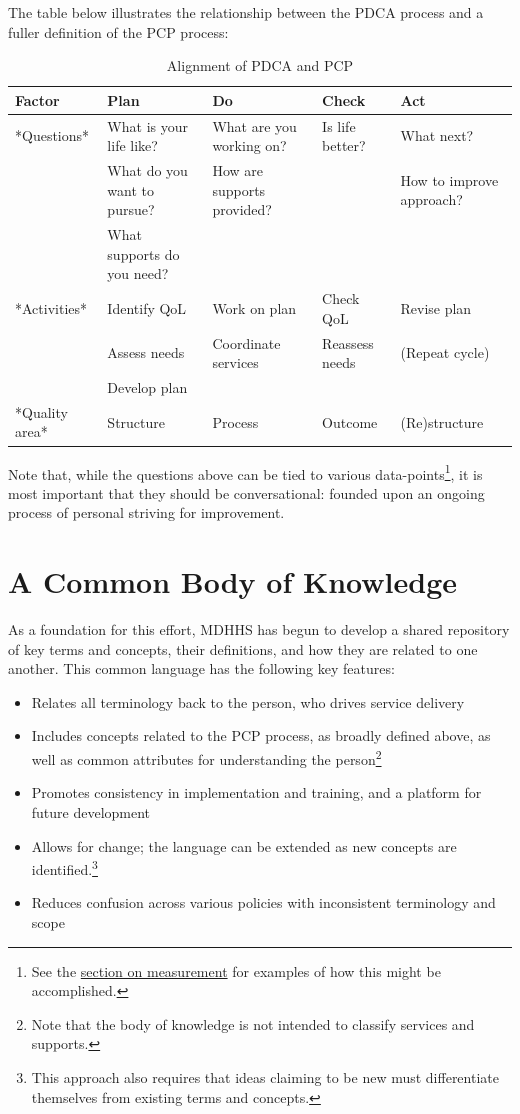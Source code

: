 \documentclass[
]{book}
\providecommand{\tightlist}{%
  \setlength{\itemsep}{0pt}\setlength{\parskip}{0pt}}
\begin{document}
The table below illustrates the relationship between the PDCA process and a fuller definition of the PCP process:

\begin{table}

\caption{\label{tab:unnamed-chunk-6}Alignment of PDCA and PCP}
\centering
\begin{tabular}[t]{l|l|l|l|l}
\hline
Factor & Plan & Do & Check & Act\\
\hline
*Questions* & What is your life like? & What are you working on? & Is life better? & What next?\\
\hline
 & What do you want to pursue? & How are supports provided? &  & How to improve approach?\\
\hline
 & What supports do you need? &  &  & \\
\hline
*Activities* & Identify QoL & Work on plan & Check QoL & Revise plan\\
\hline
 & Assess needs & Coordinate services & Reassess needs & (Repeat cycle)\\
\hline
 & Develop plan &  &  & \\
\hline
*Quality area* & Structure & Process & Outcome & (Re)structure\\
\hline
\end{tabular}
\end{table}

Note that, while the questions above can be tied to various data-points\footnote{See the \protect\hyperlink{measure}{section on measurement} for examples of how this might be accomplished.}, it is most important that they should be conversational: founded upon an ongoing process of personal striving for improvement.

\hypertarget{bok}{%
\chapter{A Common Body of Knowledge}\label{bok}}

As a foundation for this effort, MDHHS has begun to develop a shared repository of key terms and concepts, their definitions, and how they are related to one another. This common language has the following key features:

\begin{itemize}
\tightlist
\item
  Relates all terminology back to the person, who drives service delivery
\item
  Includes concepts related to the PCP process, as broadly defined above, as well as common attributes for understanding the person\footnote{Note that the body of knowledge is not intended to classify services and supports.}
\item
  Promotes consistency in implementation and training, and a platform for future development
\item
  Allows for change; the language can be extended as new concepts are identified.\footnote{This approach also requires that ideas claiming to be new must differentiate themselves from existing terms and concepts.}
\item
  Reduces confusion across various policies with inconsistent terminology and scope
\end{itemize}
\end{document}
